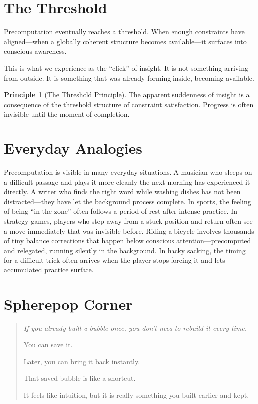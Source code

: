 \documentclass[11pt]{book}
\theoremstyle{definition}
\newtheorem{principle}[definition]{Principle}
\theoremstyle{remark}
\newenvironment{spherepopjunior}
  {\begin{quote}\small\itshape}
  {\end{quote}}
\begin{document}
\section{The Threshold}

Precomputation eventually reaches a threshold. When enough constraints have
aligned---when a globally coherent structure becomes available---it surfaces
into conscious awareness.

This is what we experience as the ``click'' of insight. It is not something
arriving from outside. It is something that was already forming inside,
becoming available.

\begin{principle}[The Threshold Principle]
The apparent suddenness of insight is a consequence of the threshold
structure of constraint satisfaction. Progress is often invisible until
the moment of completion.
\end{principle}

\section*{Everyday Analogies}

Precomputation is visible in many everyday situations. A musician who
sleeps on a difficult passage and plays it more cleanly the next morning
has experienced it directly. A writer who finds the right word while
washing dishes has not been distracted---they have let the background
process complete. In sports, the feeling of being ``in the zone'' often
follows a period of rest after intense practice. In strategy games,
players who step away from a stuck position and return often see a move
immediately that was invisible before. Riding a bicycle involves
thousands of tiny balance corrections that happen below conscious
attention---precomputed and relegated, running silently in the background.
In hacky sacking, the timing for a difficult trick often arrives when
the player stops forcing it and lets accumulated practice surface.

\section*{Spherepop Corner}

\begin{spherepopjunior}
If you already built a bubble once, you don't need to rebuild it every
time.

You can save it.

Later, you can bring it back instantly.

That saved bubble is like a shortcut.

It feels like intuition, but it is really something you built earlier
and kept.
\end{spherepopjunior}
\end{document}
